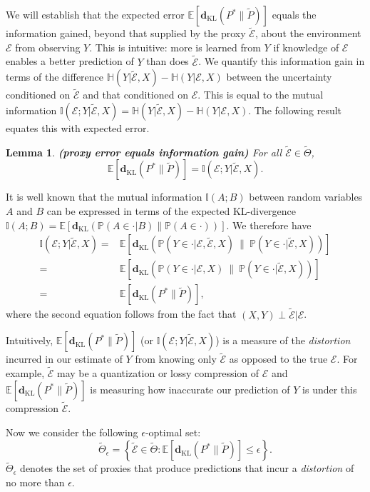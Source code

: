 \documentclass[twoside,11pt]{article}
\renewenvironment{proof}{\par\noindent{\bf Proof\ }}{\hfill\BlackBox\\[2mm]}
\newenvironment{proof}{\par\noindent{\bf Proof\ }}{\hfill\BlackBox\\[2mm]}
\newtheorem{lemma}[theorem]{Lemma}
\def\environment{\mathcal{E}}
\def\proxy{\tilde{\environment}}
\def\proxyset{\tilde{\Theta}}
\def\KL{\mathbf{d}_{\mathrm{KL}}}
\def\E{\mathbb{E}}
\def\H{\mathbb{H}}
\def\I{\mathbb{I}}
\def\Pr{\mathbb{P}}
\begin{document}
We will establish that the expected error $\E[\KL(P^* \| \tilde{P})]$ equals the information gained, beyond that supplied by the proxy $\proxy$, about the environment $\environment$ from observing $Y$.  This is intuitive: more is learned from $Y$ if knowledge of $\environment$ enables a better prediction of $Y$ than does $\proxy$.  We quantify this information gain in terms of the difference $\H(Y | \proxy, X) - \H(Y | \environment, X)$ between the uncertainty conditioned on $\proxy$ and that conditioned on $\environment$.  This is equal to the mutual information $\I(\environment; Y | \proxy, X) = \H(Y | \proxy, X) - \H(Y | \environment, X)$.  The following result equates this with expected error.
\begin{lemma}
\label{le:proxy-error-and-environment-information}
{\bf (proxy error equals information gain)}
For all $\proxy \in \proxyset$,
$$\E[\KL(P^* \| \tilde{P})] = \I(\environment; Y | \proxy, X).$$
\end{lemma}
\begin{proof}
It is well known that the mutual information $\I(A;B)$ between random variables $A$ and $B$ can be expressed in terms of the expected KL-divergence $\I(A; B) = \E[\KL(\Pr(A\in \cdot|B) \| \Pr(A \in \cdot))]$.  We therefore have
\begin{align*}
\I(\environment; Y| \proxy, X) 
=& \E[\KL(\Pr(Y \in\cdot | \environment, \proxy, X) \ \| \ \Pr(Y \in \cdot | \proxy, X))] \\
=& \E[\KL(\Pr(Y \in\cdot | \environment, X) \ \| \ \Pr(Y \in \cdot | \proxy, X))] \\
=& \E[\KL(P^*\|\tilde{P})],
\end{align*}
where the second equation follows from the fact that $(X, Y) \perp \proxy|\environment$.
\end{proof}

Intuitively, $\E[\KL(P^*\|\tilde{P})]$ (or $\I(\environment;Y|\proxy, X)$) is a measure of the \emph{distortion} incurred in our estimate of $Y$ from knowing only $\proxy$ as opposed to the true $\environment$. For example, $\proxy$ may be a quantization or lossy compression of $\environment$ and $\E[\KL(P^*\|\tilde{P})]$ is measuring how inaccurate our prediction of $Y$ is under this compression $\proxy$.

Now we consider the following $\epsilon$-optimal set:
$$\proxyset_\epsilon = \left\{\proxy \in \proxyset : \E[\KL(P^* \| \tilde{P})] \leq \epsilon\right\}.$$
$\proxyset_\epsilon$ denotes the set of proxies that produce predictions that incur a \emph{distortion} of no more than $\epsilon$.
\end{document}
